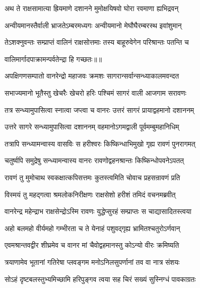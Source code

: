 \twolineshloka
{अथ ते राक्षसामात्या ह्रियमाणे दशानने}
{मुमोक्षयिषवो घोरा रवमाणा ह्यभिद्रवन्} %

\twolineshloka
{अन्वीयमानस्तैर्वाली भ्राजतेऽम्बरमध्यगः}
{अन्वीयमानो मेघौघैरम्बरस्थ इवांशुमान्} %

\twolineshloka
{तेऽशक्नुवन्तः सम्प्राप्तं वालिनं राक्षसोत्तमाः}
{तस्य बाहूरुवेगेन परिश्रान्तः पतन्ति च} %

{वालिमार्गादपाक्रामन्पर्वतेन्द्रा हि गच्छतः॥॥} %

\addtocounter{shlokacount}{1}

\twolineshloka
{अपक्षिगणसम्पातो वानरेन्द्रो महाजवः}
{क्रमशः सागरान्सर्वान्सन्ध्याकालमवन्दत} %

\twolineshloka
{सभाज्यमानो भूतैस्तु खेचरैः खेचरो हरिः}
{पश्चिमं सागरं वाली आजगाम सरावणः} %

\twolineshloka
{तत्र सन्ध्यामुपासित्वा स्नात्वा जप्त्वा च वानरः}
{उत्तरं सागरं प्रायाद्वहमानो दशाननम्} %

\twolineshloka
{उत्तरे सागरे सन्ध्यामुपासित्वा दशाननम्}
{वहमानोऽगमद्वाली पूर्वमम्बुमहानिधिम्} %

\twolineshloka
{तत्रापि सन्ध्यामन्वास्य वासविः स हरीश्वरः}
{किष्किन्धाभिमुखो गृह्य रावणं पुनरागमत्} %

\twolineshloka
{चतुर्ष्वपि समुद्रेषु सन्ध्यामन्वास्य वानरः}
{रावणोद्वहनश्रान्तः किष्किन्धोपवनेऽपतत्} %

\twolineshloka
{रावणं तु मुमोचाथ स्वकक्षात्कपिसत्तमः}
{कुतस्त्वमिति चोवाच प्रहसन्रावणं प्रति} %

\twolineshloka
{विस्मयं तु महद्गत्वा श्रमलोकनिरीक्षणः}
{राक्षसेशो हरीशं तमिदं वचनमब्रवीत्} %

\twolineshloka
{वानरेन्द्र महेन्द्राभ राक्षसेन्द्रोऽस्मि रावणः}
{युद्धेप्सुरहं सम्प्राप्तः स चाद्यासादितस्त्वया} %

\twolineshloka
{अहो बलमहो वीर्यमहो गम्भीरता च ते}
{येनाहं पशुवद्गृह्य भ्रामितश्चतुरोऽर्णवान्} %

\twolineshloka
{एवमश्रान्तवद्वीर शीघ्रमेव च वानर}
{मां चैवोद्वहमानस्तु कोऽन्यो वीरः क्रमिष्यति} %

\twolineshloka
{त्रयाणामेव भूतानां गतिरेषा प्लवङ्गम}
{मनोऽनिलसुपर्णानां तव वा नात्र संशयः} %

\twolineshloka
{सोऽहं दृष्टबलस्तुभ्यमिच्छामि हरिपुङ्गव}
{त्वया सह चिरं सख्यं सुस्निग्धं पावकाग्रतः} %

